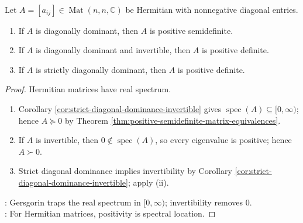 \begin{corollary} \label{cor:diagonal-dominant-hermitian-positive-semidefinite} \\
Let $A=[a_{ij}]\in\operatorname{Mat}(n,n,\mathbb{C})$ be Hermitian with nonnegative diagonal entries.
\begin{enumerate}[label=(\roman*)]
\setlength{\itemsep}{0pt}
\item If $A$ is diagonally dominant, then $A$ is positive semidefinite.
\item If $A$ is diagonally dominant and invertible, then $A$ is positive definite.
\item If $A$ is strictly diagonally dominant, then $A$ is positive definite.
\end{enumerate}
\begin{proof}
Hermitian matrices have real spectrum.
\begin{enumerate}[label=(\roman*)]
\setlength{\itemsep}{0pt}
\item Corollary \ref{cor:strict-diagonal-dominance-invertible} gives $\operatorname{spec}(A)\subseteq[0,\infty)$; hence $A\succeq0$ by Theorem \ref{thm:positive-semidefinite-matrix-equivalences}.
\item If $A$ is invertible, then $0\notin\operatorname{spec}(A)$, so every eigenvalue is positive; hence $A\succ0$.
\item Strict diagonal dominance implies invertibility by Corollary \ref{cor:strict-diagonal-dominance-invertible}; apply (ii).
\end{enumerate}
: Gersgorin traps the real spectrum in $[0,\infty)$; invertibility removes $0$.\\
: For Hermitian matrices, positivity is spectral location.
\end{proof}
\end{corollary}

